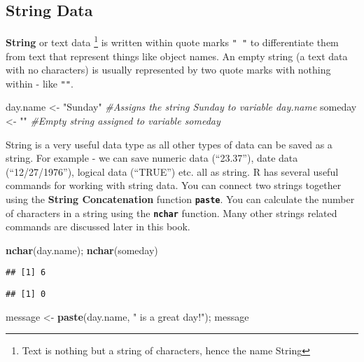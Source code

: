 \documentclass[
]{krantz}
\makeatletter
\newenvironment{Shaded}{\begin{snugshade}}{\end{snugshade}}
\newcommand{\CommentTok}[1]{\textcolor[rgb]{0.37,0.37,0.37}{\textit{#1}}}
\newcommand{\KeywordTok}[1]{\textcolor[rgb]{0.27,0.27,0.27}{\textbf{#1}}}
\newcommand{\NormalTok}[1]{#1}
\newcommand{\StringTok}[1]{\textcolor[rgb]{0.5,0.5,0.5}{#1}}
\newenvironment{kframe}{%
\medskip{}
\setlength{\fboxsep}{.8em}
 \def\at@end@of@kframe{}%
 \ifinner\ifhmode%
  \def\at@end@of@kframe{\end{minipage}}%
  \begin{minipage}{\columnwidth}%
 \fi\fi%
 \def\FrameCommand##1{\hskip\@totalleftmargin \hskip-\fboxsep
 \colorbox{shadecolor}{##1}\hskip-\fboxsep
     \hskip-\linewidth \hskip-\@totalleftmargin \hskip\columnwidth}%
 \MakeFramed {\advance\hsize-\width
   \@totalleftmargin\z@ \linewidth\hsize
   \@setminipage}}%
 {\par\unskip\endMakeFramed%
 \at@end@of@kframe}
\renewenvironment{Shaded}{\begin{kframe}}{\end{kframe}}
\makeatother
\begin{document}
\hypertarget{string-data}{%
\subsection{String Data}\label{string-data}}

\textbf{String} or text data \footnote{Text is nothing but a string of characters, hence the name String} is written within quote marks \texttt{"\ "} to differentiate them from text that represent things like object names. An empty string (a text data with no characters) is usually represented by two quote marks with nothing within - like \texttt{""}.

\begin{Shaded}
\begin{Highlighting}[]
\NormalTok{day.name <-}\StringTok{ "Sunday"} \CommentTok{#Assigns the string Sunday to variable day.name}
\NormalTok{someday <-}\StringTok{ ""} \CommentTok{#Empty string assigned to variable someday}
\end{Highlighting}
\end{Shaded}

String is a very useful data type as all other types of data can be saved as a string. For example - we can save numeric data (``23.37''), date data (``12/27/1976''), logical data (``TRUE'') etc. all as string. R has several useful commands for working with string data. You can connect two strings together using the \textbf{String Concatenation} function \textbf{\texttt{paste}}. You can calculate the number of characters in a string using the \textbf{\texttt{nchar}} function. Many other strings related commands are discussed later in this book.

\begin{Shaded}
\begin{Highlighting}[]
\KeywordTok{nchar}\NormalTok{(day.name); }\KeywordTok{nchar}\NormalTok{(someday)}
\end{Highlighting}
\end{Shaded}

\begin{verbatim}
## [1] 6
\end{verbatim}

\begin{verbatim}
## [1] 0
\end{verbatim}

\begin{Shaded}
\begin{Highlighting}[]
\NormalTok{message <-}\StringTok{ }\KeywordTok{paste}\NormalTok{(day.name, }\StringTok{" is a great day!"}\NormalTok{); message}
\end{Highlighting}
\end{Shaded}
\end{document}
